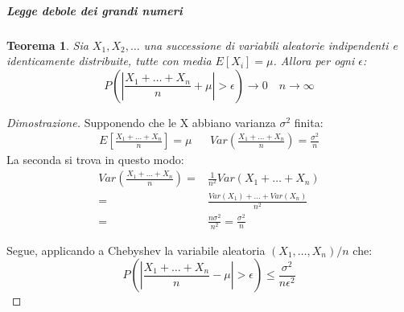 \documentclass[12pt]{article}
\newtheorem{theorem}{Teorema}[section]
\begin{document}
\subparagraph*{Legge debole dei grandi numeri}

\begin{theorem}
    Sia \(X_1,X_2,\dots\) una successione di variabili aleatorie indipendenti e 
    identicamente distribuite, tutte con media \(E[X_i] = \mu\). Allora per ogni \(\epsilon\):
    \[
    P \left( \left| \frac{X_1+\dots+X_n}{n} + \mu \right| > \epsilon \right) \longrightarrow 0 \quad n \longrightarrow \infty    
    \]
\end{theorem}
\begin{proof}[Dimostrazione]
    Supponendo che le X abbiano varianza \(\sigma^2\) finita:
    \begin{align*}
        E \left[ \frac{X_1+\dots+X_n}{n} \right] = \mu &  &Var\left( \frac{X_1+\dots+X_n}{n} \right) = \frac{\sigma^2}{n} 
    \end{align*}
    La seconda si trova in questo modo: 
    \begin{align*}
        Var\left( \frac{X_1+\dots+X_n}{n} \right) = & \frac{1}{n^2} Var(X_1+\dots+X_n) \\
        = & \frac{Var(X_1)+\dots+Var(X_n)}{n^2} \\ 
        = & \frac{n\sigma^2}{n^2} = \frac{\sigma^2}{n}
    \end{align*}

    Segue, applicando a Chebyshev la variabile aleatoria \((X_1,\dots,X_n)/n\) che:
    \[
    P \left( \left|\frac{X_1+\dots+X_n}{n}-\mu \right|> \epsilon\right) \le \frac{\sigma^2}{n\epsilon^2}    
    \]
\end{proof}
\end{document}
